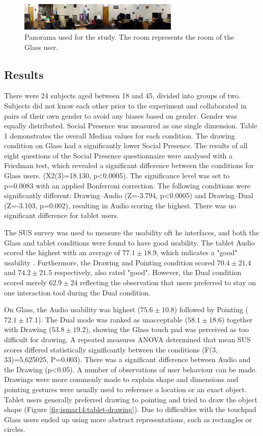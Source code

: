 \begin{figure}[ht]
	\centering
	\includegraphics[width=3in]{images/ismar14/envrionment-setup}
	\caption{Panorama used for the study. The room represents the room of the Glass user.}
	\label{fig:ismar14:envrionment-setup}
\end{figure}

\subsection{Results}

There were 24 subjects aged between 18 and 45, divided into groups of two. Subjects did not know each other prior to the experiment and collaborated in pairs of their own gender to avoid any biases based on gender. Gender was equally distributed. Social Presence was measured as one single dimension. Table 1 demonstrates the overall Median values for each condition. The drawing condition on Glass had a significantly lower Social Presence. The results of all eight questions of the Social Presence questionnaire were analysed with a Friedman test, which revealed a significant difference between the conditions for Glass users. (X2(3)=18.130, p<0.0005). The significance level was set to p=0.0083 with an applied Bonferroni correction. The following conditions were significantly different: Drawing–Audio (Z=-3.794, p<0.0005) and Drawing–Dual (Z=-3.103, p=0.002), resulting in Audio scoring the highest. There was no significant difference for tablet users.

The SUS survey was used to measure the usability oft he interfaces, and both the Glass and tablet conditions were found to have good usability. The tablet Audio scored the highest with an average of $77.1\pm18.9$, which indicates a "good" usability \cite{Bangor2008}. Furthermore, the Drawing and Pointing condition scored $70.4\pm21.4$ and $74.2\pm21.5$ respectively, also rated "good". However, the Dual condition scored merely $62.9\pm24$ reflecting the observation that users preferred to stay on one interaction tool during the Dual condition.

On Glass, the Audio usability was highest ($75.6\pm10.8$) followed by Pointing ($72.1\pm17.1$). The Dual mode was ranked as unacceptable ($58.1\pm18.6$) together with Drawing ($53.8\pm19.2$), showing the Glass touch pad was perceived as too difficult for drawing. A repeated measures ANOVA determined that mean SUS scores differed statistically significantly between the conditions (F(3, 33)=5,625025, P=0.003). There was a significant difference between Audio and the Drawing (p<0.05). A number of observations of user behaviour can be made. Drawings were more commonly made to explain shape and dimensions and pointing gestures were usually used to reference a location or an exact object. Tablet users generally preferred drawing to pointing and tried to draw the object shape (Figure \ref{fig:ismar14:tablet-drawing}). Due to difficulties with the touchpad Glass users ended up using more abstract representations, such as rectangles or circles.

